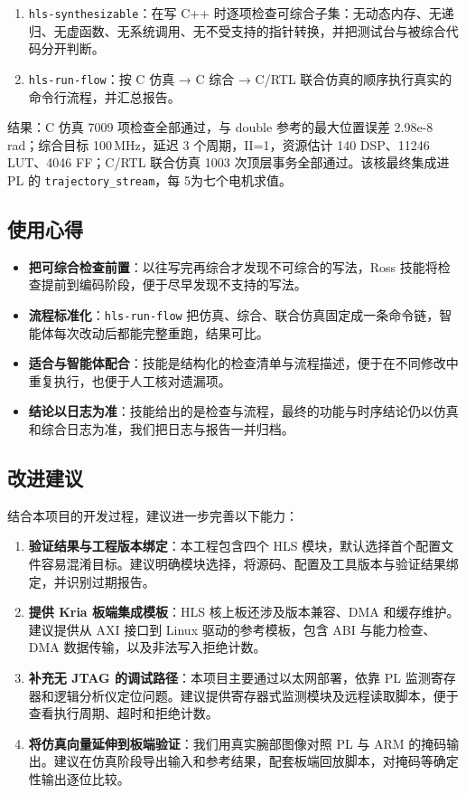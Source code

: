 \begin{enumerate}
  \item \texttt{hls-synthesizable}：在写 C++ 时逐项检查可综合子集：无动态内存、无递归、无虚函数、无系统调用、无不受支持的指针转换，并把测试台与被综合代码分开判断。
  \item \texttt{hls-run-flow}：按 C 仿真 → C 综合 → C/RTL 联合仿真的顺序执行真实的命令行流程，并汇总报告。
\end{enumerate}

结果：C 仿真 7009 项检查全部通过，与 double 参考的最大位置误差 2.98e-8\,rad；综合目标 100\,MHz，延迟 3 个周期，II=1，资源估计 140 DSP、11246 LUT、4046 FF；C/RTL 联合仿真 1003 次顶层事务全部通过。该核最终集成进 PL 的 \texttt{trajectory\_stream}，每 5\ms 为七个电机求值。

\subsection{使用心得}

\begin{itemize}
  \item \textbf{把可综合检查前置}：以往写完再综合才发现不可综合的写法，Ross 技能将检查提前到编码阶段，便于尽早发现不支持的写法。
  \item \textbf{流程标准化}：\texttt{hls-run-flow} 把仿真、综合、联合仿真固定成一条命令链，智能体每次改动后都能完整重跑，结果可比。
  \item \textbf{适合与智能体配合}：技能是结构化的检查清单与流程描述，便于在不同修改中重复执行，也便于人工核对遗漏项。
  \item \textbf{结论以日志为准}：技能给出的是检查与流程，最终的功能与时序结论仍以仿真和综合日志为准，我们把日志与报告一并归档。
\end{itemize}

\subsection{改进建议}

结合本项目的开发过程，建议进一步完善以下能力：

\begin{enumerate}
  \item \textbf{验证结果与工程版本绑定}：本工程包含四个 HLS 模块，默认选择首个配置文件容易混淆目标。建议明确模块选择，将源码、配置及工具版本与验证结果绑定，并识别过期报告。
  \item \textbf{提供 Kria 板端集成模板}：HLS 核上板还涉及版本兼容、DMA 和缓存维护。建议提供从 AXI 接口到 Linux 驱动的参考模板，包含 ABI 与能力检查、DMA 数据传输，以及非法写入拒绝计数。
  \item \textbf{补充无 JTAG 的调试路径}：本项目主要通过以太网部署，依靠 PL 监测寄存器和逻辑分析仪定位问题。建议提供寄存器式监测模块及远程读取脚本，便于查看执行周期、超时和拒绝计数。
  \item \textbf{将仿真向量延伸到板端验证}：我们用真实腕部图像对照 PL 与 ARM 的掩码输出。建议在仿真阶段导出输入和参考结果，配套板端回放脚本，对掩码等确定性输出逐位比较。
\end{enumerate}

